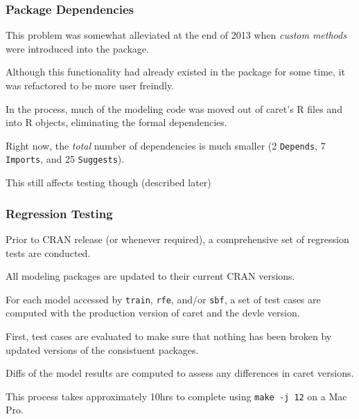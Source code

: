 \documentclass[12 pt]{beamer}\usepackage[]{graphicx}\usepackage[]{color}
\newcommand{\hlkwd}[1]{\textcolor[rgb]{0.78,0.227,0.412}{#1}}%
\newcommand{\mxkwd}[1]{\texttt{\hlkwd{#1}}}%
\newcommand{\pkg}[1]{{\fontseries{b}\selectfont #1}}
\renewcommand{\pkg}[1]{{\color{darkgreen}\textsf{#1}}}
\begin{document}
  
\begin{frame}[fragile]
\frametitle{Package Dependencies}

This problem was somewhat alleviated at the end of 2013 when {\em custom methods} were introduced into the package. 

\vspace{.15in}

Although this functionality had already existed in the package for some time, it was refactored to be more user freindly. 

\vspace{.15in}

In the process, much of the modeling code was moved out of \pkg{caret}'s R files and into R objects, eliminating the formal dependencies. 

\vspace{.15in}

Right now, the {\em total} number of dependencies is much smaller (2 \texttt{Depends}, 7 \texttt{Imports}, and 25 \texttt{Suggests}). 

\vspace{.15in}

This still affects testing though (described later)

\end{frame}


  
  \begin{frame}[fragile]
\frametitle{Regression Testing}

Prior to CRAN release (or whenever required), a comprehensive set of regression tests are conducted.

\vspace{.1in}

All modeling packages are updated to their current CRAN versions.

\vspace{.1in}

For each model accessed by \mxkwd{train}, \mxkwd{rfe}, and/or \mxkwd{sbf}, a set of test cases are computed with the production version of \pkg{caret} and the devle version. 

\vspace{.1in}

First, test cases are evaluated to make sure that nothing has been broken by updated versions of the consistuent packages. 

\vspace{.1in}

Diffs of the model results are computed to assess any differences in \pkg{caret} versions.

\vspace{.1in}

This process takes approximately 10hrs to complete using \texttt{make -j 12} on a Mac Pro. 

\end{frame}
\end{document}
